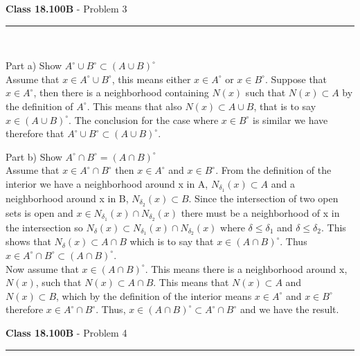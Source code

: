 \documentclass[11pt,reqno]{article}
\begin{document}
\vspace{15pt}
\begin{flushleft} 
\textbf{Class 18.100B} - Problem 3\\
\rule{500pt}{1pt}\\
\end{flushleft} 

\noindent Part a) Show $A^\circ \cup B^\circ \subset (A \cup B)^\circ$ \\ \newline
\indent Assume that $x \in A^\circ \cup B^\circ$, this means either $x \in A^\circ$ or $x \in B^\circ$. Suppose that $x \in A^\circ$, then there is a neighborhood containing $N(x)$ such that $N(x) \subset A$ by the definition of $A^\circ$. This means that also $N(x) \subset A \cup B$, that is to say $x \in (A \cup B)^\circ$. The conclusion for the case where $x \in B^\circ$ is similar we have therefore that $A^\circ \cup B^\circ \subset (A \cup B)^\circ$. \newline

\newpage
 \noindent Part b) Show $A^\circ \cap B^\circ = (A \cap B)^\circ$ \\ \newline
 \indent Assume that $x \in A^\circ \cap B^\circ$ then $x \in A^\circ$ and $x \in B^\circ$. From the definition of the interior we have a neighborhood around x in A, $N_{\delta_1}(x) \subset A$ and a neighborhood around x in B, $N_{\delta_2}(x) \subset B$. Since the intersection of two open sets is open and $x \in N_{\delta_1}(x) \cap N_{\delta_2}(x)$ there must be a neighborhood of x in the intersection so $N_\delta(x) \subset N_{\delta_1}(x) \cap N_{\delta_2}(x)$ where $\delta \le \delta_1$ and $\delta \le \delta_2$. This shows that $N_\delta(x) \subset A \cap B$ which is to say that $x \in (A \cap B)^\circ$. Thus $x \in A^\circ \cap B^\circ \subset (A \cap B)^\circ$.\\
\indent Now assume that $x \in (A \cap B)^\circ$. This means there is a neighborhood around x, $N(x)$, such that $N(x) \subset A \cap B$. This means that $N(x) \subset A$ and $N(x) \subset B$,  which by the definition of the interior means $x \in A^\circ$ and $x \in B^\circ$ therefore $x \in A^\circ \cap B^\circ$. Thus, $x \in (A \cap B)^\circ \subset A^\circ \cap B^\circ$ and we have the result.
 
\vspace{15pt}
\begin{flushleft} 
\textbf{Class 18.100B} - Problem 4\\
\rule{500pt}{1pt}\\
\end{flushleft} 
\end{document}

